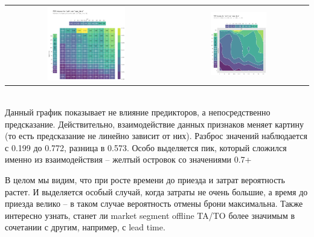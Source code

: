 \begin{tabular}{c|c}
	\arrayrulecolor[rgb]{0.8,0.85,1}
	\includegraphics*[width = 0.5\textwidth]{pics/mypdp7.png} & \includegraphics*[width = 0.42\textwidth]{pics/mypdp8.png}\\
\end{tabular}\\[2mm]

Данный график показывает не влияние предикторов, а непосредственно предсказание. Действительно, взаимодействие данных признаков меняет картину (то есть предсказание не линейно зависит от них). Разброс значений наблюдается с 0.199 до 0.772, разница в 0.573. Особо выделяется пик, который сложился именно из взаимодействия -- желтый островок со значениями 0.7+

В целом мы видим, что при росте времени до приезда и затрат вероятность растет. И выделяется особый случай, когда затраты не очень большие, а время до приезда велико -- в таком случае вероятность отмены брони максимальна.
\newpage
Также интересно узнать, станет ли market segment offline TA/TO более значимым в сочетании с другим, например, с lead time.


